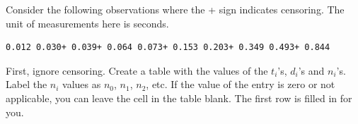 \documentclass[12pt]{article}
\begin{document}
\pagebreak

\problem Consider the following observations where the + sign indicates censoring. The unit of measurements here is seconds.

\begin{verbatim}
0.012 0.030+ 0.039+ 0.064 0.073+ 0.153 0.203+ 0.349 0.493+ 0.844
\end{verbatim}

\begin{enumerate}

 First, ignore censoring. Create a table with the values of the $t_i$'s, $d_i$'s and $n_i$'s. Label the $n_i$ values as $n_0$, $n_1$, $n_2$, etc. If the value of the entry is zero or not applicable, you can leave the cell in the table blank. The first row is filled in for you.


\end{enumerate}
\end{document}
